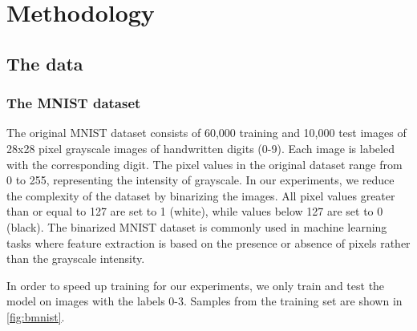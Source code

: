 \section{Methodology}\label{sec:Method}

\subsection{The data}
\subsubsection{The MNIST dataset}

The original MNIST dataset consists of 60,000 training and 10,000 test images of 28x28 pixel grayscale images of handwritten digits (0-9). Each image is labeled with the corresponding digit. The pixel values in the original dataset range from 0 to 255, representing the intensity of grayscale. In our experiments, we reduce the complexity of the dataset by binarizing the images. All pixel values greater than or equal to 127 are set to 1 (white), while values below 127 are set to 0 (black). The binarized MNIST dataset is commonly used in machine learning tasks where feature extraction is based on the presence or absence of pixels rather than the grayscale intensity.

In order to speed up training for our experiments, we only train and test the model on images with the labels 0-3. Samples from the training set are shown in \autoref{fig:bmnist}.

